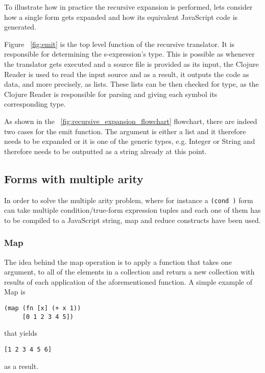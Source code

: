 

To illustrate how in practice the recursive expansion is performed, lets consider how a single form gets expanded and how its equivalent JavaScript code is generated. 



Figure ~\ref{fig:emit} is the top level function of the recursive translator. It is responsible for determining the s-expression's type. This is possible as whenever the translator gets executed and a source file is provided as its input, the Clojure Reader is used to read the input source and as a result, it outputs the code as data, and more precisely, as lists. 
These lists can be then checked for type, as the Clojure Reader is responsible for parsing and giving each symbol its corresponding type.

As shown in the ~\ref{fig:recursive_expansion_flowchart} flowchart, there are indeed two cases for the emit function. The argument is either a list and it therefore needs to be expanded or it is one of the generic types, e.g. Integer or String and therefore needs to be outputted as a string already at this point. 

\subsection{Forms with multiple arity}

In order to solve the multiple arity problem, where for instance a \texttt{(cond )} form can take multiple condition/true-form expression tuples and each one of them has to be compiled to a JavaScript string, map and reduce constructs have been used. 

\subsubsection{Map}
The idea behind the map operation is to apply a function that takes one argument, to all of the elements in a collection and return a new collection with results of each application of the aforementioned function. 
A simple example of Map is 

\begin{verbatim}
(map (fn [x] (+ x 1)) 
	 [0 1 2 3 4 5])
\end{verbatim}
that yields 
\begin{verbatim}
[1 2 3 4 5 6]
\end{verbatim}
as a result.

